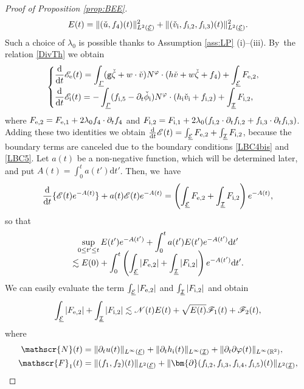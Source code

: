 \documentclass[JEP,XML,SOM,Unicode,NoFloatCountersInSection,published]{cedram}
\let\dpl\displaystyle
\newcommand{\gr}{{\mathtt g}}
\newcommand{\R}{{\mathbb R}}
\newcommand{\dt}{\partial_t}
\newcommand{\cI}{{\mathcal I}}
\newcommand{\cE}{{\mathcal E}}
\newcommand{\ul}[1]{\underline{#1}}
\newcommand{\itGamma}{\mathit{\Gamma}}
\theoremstyle{definition}
\begin{document}
\begin{proof}[Proof of Proposition \ref{prop:BEE}]
\[
E(t)=\|(\check{u},f_4)(t)\|_{L^2(\ul{\cE})}^2+\|(\check{v}_\mathrm{i},f_{{\rm i},2},f_{{\rm i},3})(t)\|_{L^2(\ul{\cE})}^2.
\]
Such a choice of $\lambda_0$ is possible thanks to Assumption \ref{ass:LP} (i)--(iii). By~the relation \eqref{DivTh} we obtain
\begin{equation}\label{BEI}
\begin{cases}
\dpl\frac{\rm d}{{\rm d}t}\mathscr{E}_\mathrm{e}(t) = \int_{\ul{\itGamma}}(\gr\check{\zeta}+w\cdot\check{v})N^\varphi\cdot(h\check{v}+w\check{\zeta}+f_4)
+ \int_{\ul{\cE}}F_{{\rm e},2}, \\[8pt]
\dpl\frac{\rm d}{{\rm d}t}\mathscr{E}_\mathrm{i}(t) = -\int_{\ul{\itGamma}}(f_{{\rm i},5}-\dt\check{\phi}_\mathrm{i})N^\varphi\cdot(h_\mathrm{i}\check{v}_\mathrm{i}+f_{{\rm i},2})
+ \int_{\ul{\cI}}F_{{\rm i},2},
\end{cases}
\end{equation}
where $F_{{\rm e},2}=F_{{\rm e},1}+2\lambda_0f_4\cdot\dt f_4$ and
$F_{{\rm i},2}=F_{{\rm i},1}+2\lambda_0(f_{{\rm i},2}\cdot\dt f_{{\rm i},2} + f_{{\rm i},3}\cdot\dt f_{{\rm i},3})$.
Adding these two identities we obtain $\frac{\rm d}{{\rm d}t}\mathscr{E}(t)=\int_{\ul{\cE}}F_{{\rm e},2}+\int_{\ul{\cI}}F_{{\rm i},2}$,
because the boundary terms are canceled due to the boundary conditions \eqref{LBC4bis} and \eqref{LBC5}.
Let $a(t)$ be a non-negative function, which will be determined later, and put $A(t)=\int_0^t a(t')\mathrm{d}t'$.
Then, we~have
\[
\frac{\rm d}{{\rm d}t}\{ \mathscr{E}(t)e^{-A(t)} \} + a(t)\mathscr{E}(t)e^{-A(t)}
= \left(\int_{\ul{\cE}}F_{{\rm e},2}+\int_{\ul{\cI}}F_{{\rm i},2} \right) e^{-A(t)},
\]
so that
\begin{multline*}
\sup_{0\leq t'\leq t}E(t')e^{-A(t')} +\int_0^t a(t')E(t')e^{-A(t')}{\rm d}t' \\[-8pt]
\lesssim E(0) + \int_0^t \left(\int_{\ul{\cE}}|F_{{\rm e},2}|+\int_{\ul{\cI}}|F_{{\rm i},2}| \right) e^{-A(t')} {\rm d}t'.
\end{multline*}
We can easily evaluate the term $\int_{\ul{\cE}}|F_{{\rm e},2}|$ and $\int_{\ul{\cI}}|F_{{\rm i},2}|$ and obtain
\[
\int_{\ul{\cE}}|F_{{\rm e},2}|+\int_{\ul{\cI}}|F_{{\rm i},2}|
\lesssim \mathscr{N}(t)E(t)+\sqrt{E(t)}\mathscr{F}_1(t)+\mathscr{F}_2(t),
\]
where
\begin{align*}
\mathscr{N}(t)
&= \|\dt u(t)\|_{L^\infty(\ul{\cE})}+\|\dt h_\mathrm{i}(t)\|_{L^\infty(\ul{\cI})}+\|\dt\partial\varphi(t)\|_{L^\infty(\R^2)}, \\
\mathscr{F}_1(t)
&= \|(f_1,f_2)(t)\|_{L^2(\ul{\cE})} + \|\bm{\partial}(f_{{\rm i},2},f_{{\rm i},3},f_{{\rm i},4},f_{{\rm i},5})(t)\|_{L^2(\ul{\cI})}, \\

\end{align*}
\end{proof}
\end{document}
